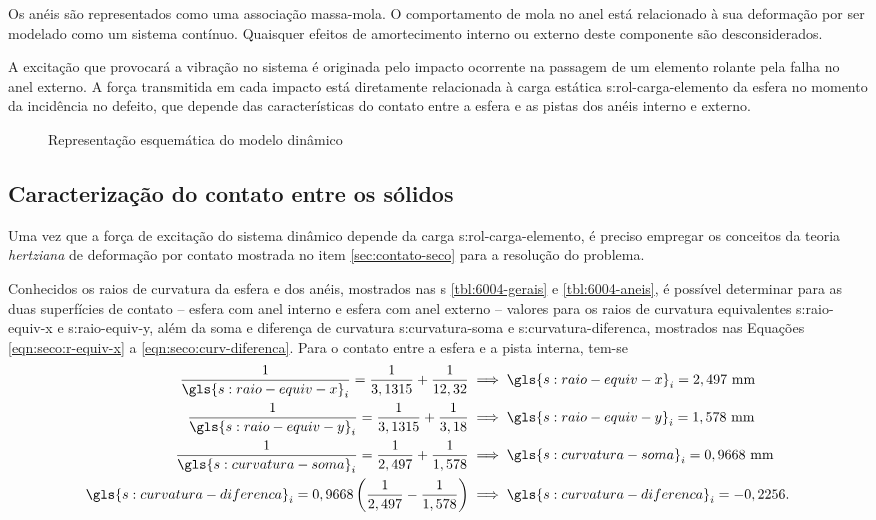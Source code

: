 \documentclass[12pt,oneside,english,brazil,lmodern,siglas,simbolos,cite=num]{ucsmonograph}
\begin{document}
	Os anéis são representados como uma associação massa-mola.
	O comportamento de mola no anel está relacionado à sua deformação por ser modelado como um sistema contínuo.
	Quaisquer efeitos de amortecimento interno ou externo deste componente são desconsiderados.
	
	A excitação que provocará a vibração no sistema é originada pelo impacto ocorrente na passagem de um elemento rolante pela falha no anel externo.
	A força transmitida em cada impacto está diretamente relacionada à carga estática \gls{s:rol-carga-elemento} da esfera no momento da incidência no defeito, que depende das características do contato entre a esfera e as pistas dos anéis interno e externo.
		
	\begin{figure}[t]
		\caption{Representação esquemática do modelo dinâmico}
		\label{fig:modelo-dinamico}
	\end{figure}
	
	\subsection{Caracterização do contato entre os sólidos}
	Uma vez que a força de excitação do sistema dinâmico depende da carga \gls{s:rol-carga-elemento}, é preciso empregar os conceitos da teoria \emph{hertziana} de deformação por contato mostrada no item \ref{sec:contato-seco} para a resolução do problema.
	
	Conhecidos os raios de curvatura da esfera e dos anéis, mostrados nas \tablename s \ref{tbl:6004-gerais} e \ref{tbl:6004-aneis}, é possível determinar para as duas superfícies de contato -- esfera com anel interno e esfera com anel externo -- valores para os raios de curvatura equivalentes \gls{s:raio-equiv-x} e \gls{s:raio-equiv-y}, além da soma e diferença de curvatura \gls{s:curvatura-soma} e \gls{s:curvatura-diferenca}, mostrados nas Equações \ref{eqn:seco:r-equiv-x} a \ref{eqn:seco:curv-diferenca}.
	Para o contato entre a esfera e a pista interna, tem-se
	\begin{align*}
		\frac{1}{\gls{s:raio-equiv-x}_i} = \frac{1}{3,1315} +
		\frac{1}{12,32} &\implies \gls{s:raio-equiv-x}_i =
		2,497\ \text{mm} \\
		\frac{1}{\gls{s:raio-equiv-y}_i} = \frac{1}{3,1315} +
		\frac{1}{3,18} &\implies \gls{s:raio-equiv-y}_i =
		1,578\ \text{mm} \\
		\frac{1}{\gls{s:curvatura-soma}_i} = \frac{1}{2,497} +
		\frac{1}{1,578} &\implies \gls{s:curvatura-soma}_i =
		0,9668\ \text{mm}\\
		\gls{s:curvatura-diferenca}_i = 0,9668\left( 
		\frac{1}{2,497} - \frac{1}{1,578} \right) &\implies
		\gls{s:curvatura-diferenca}_i = -0,2256.
	\end{align*}
	
\end{document}
